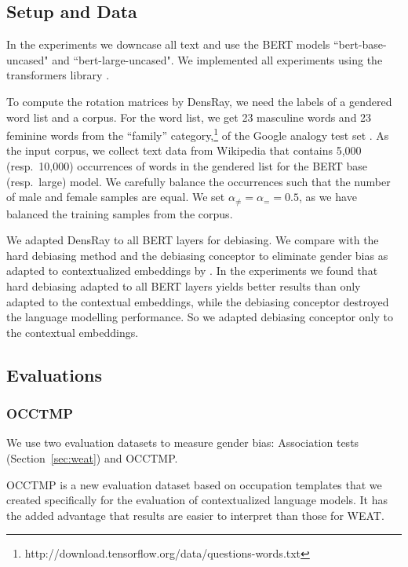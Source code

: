\subsection{Setup and Data}
In the experiments we downcase all  text  and use the BERT models ``bert-base-uncased" and ``bert-large-uncased". We implemented all experiments using the transformers library \cite{wolf2019huggingfaces}.

To compute the rotation matrices by DensRay, we need the
labels of a gendered word list and a corpus. For the word
list, we get 23 masculine words and 23 feminine words from
the ``family''
category,\footnote{http://download.tensorflow.org/data/questions-words.txt}
of the Google analogy test set . As the input corpus, we collect text data from Wikipedia that contains 5,000 (resp.\ 10,000)
occurrences of words in the gendered list for the BERT base
(resp.\ large) model. We carefully balance the occurrences such that the number of male and female samples are equal. We set  $\alpha_{\neq}=\alpha_{=}=0.5$, as we have balanced the training samples from the corpus.

We adapted DensRay to all BERT layers for debiasing. We compare with the hard debiasing method \cite{mu2018all} and the debiasing conceptor \cite{karve2019conceptor} to eliminate gender bias as adapted to contextualized embeddings by \cite{karve2019conceptor}. In the experiments we found that hard debiasing adapted to all BERT layers yields better results than only adapted to the contextual embeddings, while the debiasing conceptor destroyed the language modelling performance. So we adapted debiasing conceptor only to the contextual embeddings. 

\subsection{Evaluations}
\subsubsection{OCCTMP}
We use two evaluation datasets
to measure gender
bias: Association tests (Section~\ref{sec:weat}) and OCCTMP.

OCCTMP is a new evaluation dataset
based on occupation templates
that we created specifically
for
the evaluation of contextualized language models.  It has
the added advantage that results are easier to interpret
than those for WEAT.

